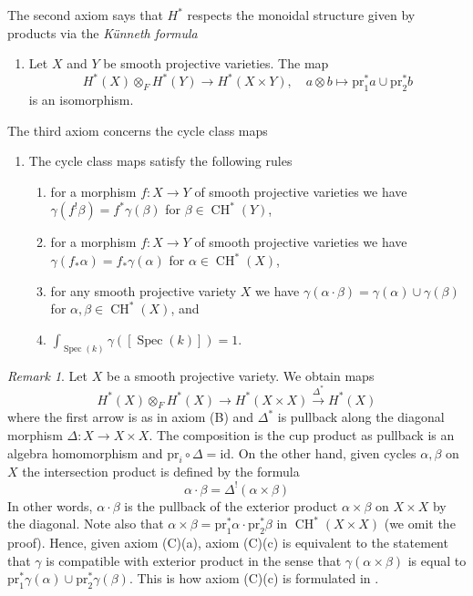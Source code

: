 \documentclass{stacks-project}
\theoremstyle{plain}
\theoremstyle{definition}
\theoremstyle{remark}
\newtheorem{remark}[subsection]{Remark}
\numberwithin{equation}{subsection}
\def\Spec{\mathop{\mathrm{Spec}}}
\def\CH{\mathop{\mathrm{CH}}\nolimits}
\begin{document}
\noindent
The second axiom says that $H^*$ respects the monoidal structure
given by products via the {\it K\"unneth formula}
\begin{enumerate}
\item[(B)] Let $X$ and $Y$ be smooth projective varieties. The map
$$
H^*(X) \otimes_F H^*(Y) \to H^*(X \times Y),\quad
a \otimes b \mapsto \text{pr}_1^*a \cup \text{pr}_2^*b
$$
is an isomorphism.
\end{enumerate}
The third axiom concerns the cycle class maps
\begin{enumerate}
\item[(C)] The cycle class maps satisfy the following rules
\begin{enumerate}
\item for a morphism $f : X \to Y$ of smooth projective varieties
we have $\gamma(f^!\beta) = f^*\gamma(\beta)$ for $\beta \in \CH^*(Y)$,
\item for a morphism $f : X \to Y$ of smooth projective varieties we have
$\gamma(f_*\alpha) = f_*\gamma(\alpha)$ for $\alpha \in \CH^*(X)$,
\item for any smooth projective variety $X$ we have
$\gamma(\alpha \cdot \beta) = \gamma(\alpha) \cup \gamma(\beta)$
for $\alpha, \beta \in \CH^*(X)$, and
\item $\int_{\Spec(k)} \gamma([\Spec(k)]) = 1$.
\end{enumerate}
\end{enumerate}

\begin{remark}
\label{remark-replace-cup-product-classical}
Let $X$ be a smooth projective variety. We obtain maps
$$
H^*(X) \otimes_F H^*(X) \longrightarrow H^*(X \times X)
\xrightarrow{\Delta^*} H^*(X)
$$
where the first arrow is as in axiom (B) and $\Delta^*$
is pullback along the diagonal morphism $\Delta : X \to X \times X$.
The composition is the cup product as pullback is an algebra homomorphism and
$\text{pr}_i \circ \Delta = \text{id}$.
On the other hand, given cycles $\alpha, \beta$ on $X$ 
the intersection product is defined by the formula
$$
\alpha \cdot \beta =
\Delta^!(\alpha \times \beta)
$$
In other words, $\alpha \cdot \beta$ is the pullback of the
exterior product $\alpha \times \beta$ on $X \times X$ by
the diagonal. Note also that
$\alpha \times \beta = \text{pr}_1^*\alpha \cdot \text{pr}_2^*\beta$
in $\CH^*(X \times X)$ (we omit the proof). Hence, given axiom (C)(a),
axiom (C)(c) is equivalent to the statement that $\gamma$ is
compatible with exterior product in the sense that
$\gamma(\alpha \times \beta)$ is equal to
$\text{pr}_1^*\gamma(\alpha) \cup \text{pr}_2^*\gamma(\beta)$.
This is how axiom (C)(c) is formulated in \cite{Kleiman-cycles}.
\end{remark}
\end{document}
